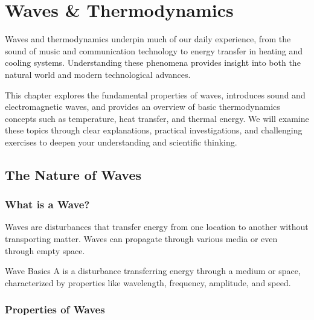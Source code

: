 \chapter{Waves \& Thermodynamics}

Waves and thermodynamics underpin much of our daily experience, from the sound of music and communication technology to energy transfer in heating and cooling systems. Understanding these phenomena provides insight into both the natural world and modern technological advances.

This chapter explores the fundamental properties of waves, introduces sound and electromagnetic waves, and provides an overview of basic thermodynamics concepts such as temperature, heat transfer, and thermal energy. We will examine these topics through clear explanations, practical investigations, and challenging exercises to deepen your understanding and scientific thinking.

\section{The Nature of Waves}
\FloatBarrier

\subsection{What is a Wave?}
\FloatBarrier

Waves are disturbances that transfer energy from one location to another without transporting matter. Waves can propagate through various media or even through empty space.

\begin{marginfigure}[0pt]
\caption{Wave propagation transfers energy without moving matter.}
\end{marginfigure}

\begin{keyconcept}{Wave Basics}
A  is a disturbance transferring energy through a medium or space, characterized by properties like wavelength, frequency, amplitude, and speed.
\end{keyconcept}


\subsection{Properties of Waves}
\FloatBarrier

